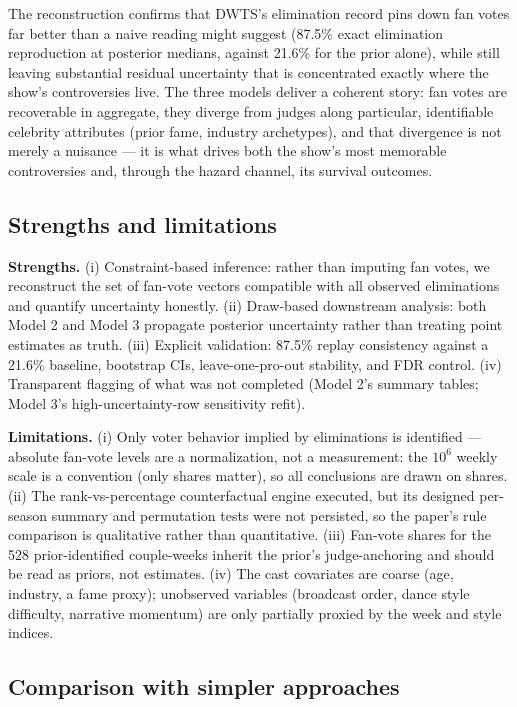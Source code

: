 The reconstruction confirms that DWTS's elimination record pins down fan votes far
better than a naive reading might suggest (87.5\% exact elimination reproduction at
posterior medians, against 21.6\% for the prior alone), while still leaving
substantial residual uncertainty that is concentrated exactly where the show's
controversies live. The three models deliver a coherent story: fan votes are
recoverable in aggregate, they diverge from judges along particular, identifiable
celebrity attributes (prior fame, industry archetypes), and that divergence is
not merely a nuisance --- it is what drives both the show's most memorable
controversies and, through the hazard channel, its survival outcomes.

\subsection{Strengths and limitations}

\textbf{Strengths.} (i) Constraint-based inference: rather than imputing fan
votes, we reconstruct the set of fan-vote vectors compatible with all observed
eliminations and quantify uncertainty honestly. (ii) Draw-based downstream
analysis: both Model 2 and Model 3 propagate posterior uncertainty rather than
treating point estimates as truth. (iii) Explicit validation: 87.5\% replay
consistency against a 21.6\% baseline, bootstrap CIs, leave-one-pro-out
stability, and FDR control. (iv) Transparent flagging of what was not
completed (Model 2's summary tables; Model 3's high-uncertainty-row
sensitivity refit).

\textbf{Limitations.} (i) Only voter behavior implied by eliminations is
identified --- absolute fan-vote levels are a normalization, not a measurement: the
$10^6$ weekly scale is a convention (only shares matter), so all conclusions are
drawn on shares. (ii) The rank-vs-percentage
counterfactual engine executed, but its designed per-season summary and
permutation tests were not persisted, so the paper's rule comparison is
qualitative rather than quantitative. (iii) Fan-vote shares for the 528
prior-identified couple-weeks inherit the prior's judge-anchoring and should be
read as priors, not estimates. (iv) The cast covariates are coarse (age,
industry, a fame proxy); unobserved variables (broadcast order, dance style
difficulty, narrative momentum) are only partially proxied by the week and
style indices.

\subsection{Comparison with simpler approaches}

